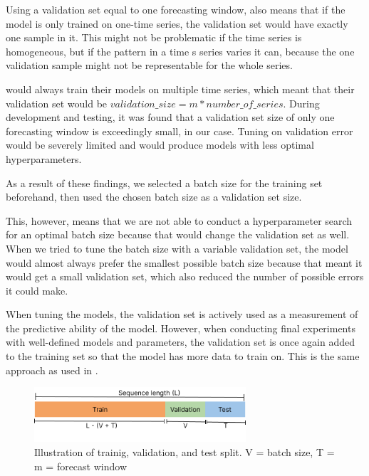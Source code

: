 Using a validation set equal to one forecasting window, also means that if the model is only trained on one-time series, the validation
set would have exactly one sample in it. This might not be problematic if the time series is homogeneous, but if the pattern in a time s
series varies it can, because the one validation sample might not be representable for the whole series.

\cite{Bandara2019} would always train their models on multiple time series,
which meant that their validation set would be $validation\_size = m * number\_of\_series$.
During development and testing, it was found that a validation set size of only one forecasting window is exceedingly small, in our case.
Tuning on validation error would be severely limited and would produce models with less optimal hyperparameters.

As a result of these findings, we selected a batch size for the training set beforehand, then
used the chosen batch size as a validation set size.

This, however, means that we are not able to conduct a hyperparameter search for an optimal batch size
because that would change the validation set as well.
When we tried to tune the batch size with a variable validation set, the model would almost always prefer the smallest possible batch size because that meant
it would get a small validation set, which also reduced the number of possible errors it could make.

When tuning the models, the validation set is actively used as a measurement of the predictive ability of the model.
However, when conducting final experiments with well-defined models and parameters,
the validation set is once again added to the training set so that the model has more data to train on.
This is the same approach as used in \cite{Hewamalage2021}.




\begin{figure}[h!]
  \centering
  \includegraphics[width=0.7\textwidth]{./figs/illustrations/illustration_train_val_test_split.png}
  \hfill
  \caption{Illustration of trainig, validation, and test split. V = batch size, T = m = forecast window}
  \label{fig:train-val-test-split}
\end{figure}

